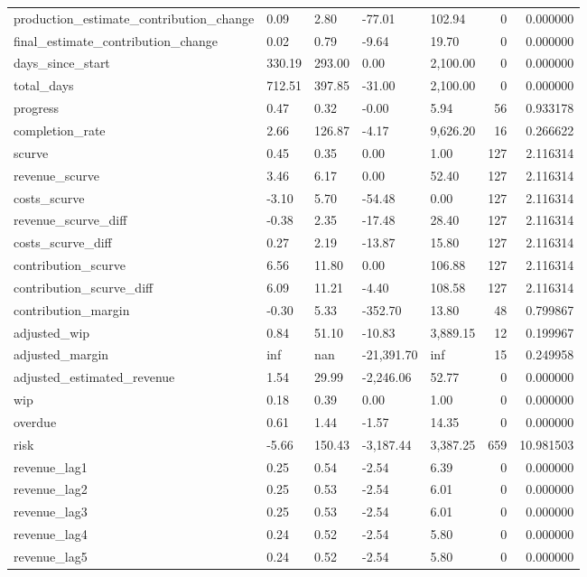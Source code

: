 \begin{landscape}
\begin{longtable}[h!]{lllllrr}
production_estimate_contribution_change & 0.09 & 2.80 & -77.01 & 102.94 & 0 & 0.000000 \\
final_estimate_contribution_change & 0.02 & 0.79 & -9.64 & 19.70 & 0 & 0.000000 \\
days_since_start & 330.19 & 293.00 & 0.00 & 2,100.00 & 0 & 0.000000 \\
total_days & 712.51 & 397.85 & -31.00 & 2,100.00 & 0 & 0.000000 \\
progress & 0.47 & 0.32 & -0.00 & 5.94 & 56 & 0.933178 \\
completion_rate & 2.66 & 126.87 & -4.17 & 9,626.20 & 16 & 0.266622 \\
scurve & 0.45 & 0.35 & 0.00 & 1.00 & 127 & 2.116314 \\
revenue_scurve & 3.46 & 6.17 & 0.00 & 52.40 & 127 & 2.116314 \\
costs_scurve & -3.10 & 5.70 & -54.48 & 0.00 & 127 & 2.116314 \\
revenue_scurve_diff & -0.38 & 2.35 & -17.48 & 28.40 & 127 & 2.116314 \\
costs_scurve_diff & 0.27 & 2.19 & -13.87 & 15.80 & 127 & 2.116314 \\
contribution_scurve & 6.56 & 11.80 & 0.00 & 106.88 & 127 & 2.116314 \\
contribution_scurve_diff & 6.09 & 11.21 & -4.40 & 108.58 & 127 & 2.116314 \\
contribution_margin & -0.30 & 5.33 & -352.70 & 13.80 & 48 & 0.799867 \\
adjusted_wip & 0.84 & 51.10 & -10.83 & 3,889.15 & 12 & 0.199967 \\
adjusted_margin & inf & nan & -21,391.70 & inf & 15 & 0.249958 \\
adjusted_estimated_revenue & 1.54 & 29.99 & -2,246.06 & 52.77 & 0 & 0.000000 \\
wip & 0.18 & 0.39 & 0.00 & 1.00 & 0 & 0.000000 \\
overdue & 0.61 & 1.44 & -1.57 & 14.35 & 0 & 0.000000 \\
risk & -5.66 & 150.43 & -3,187.44 & 3,387.25 & 659 & 10.981503 \\
revenue_lag1 & 0.25 & 0.54 & -2.54 & 6.39 & 0 & 0.000000 \\
revenue_lag2 & 0.25 & 0.53 & -2.54 & 6.01 & 0 & 0.000000 \\
revenue_lag3 & 0.25 & 0.53 & -2.54 & 6.01 & 0 & 0.000000 \\
revenue_lag4 & 0.24 & 0.52 & -2.54 & 5.80 & 0 & 0.000000 \\
revenue_lag5 & 0.24 & 0.52 & -2.54 & 5.80 & 0 & 0.000000 \\

\end{longtable}
\end{landscape}
